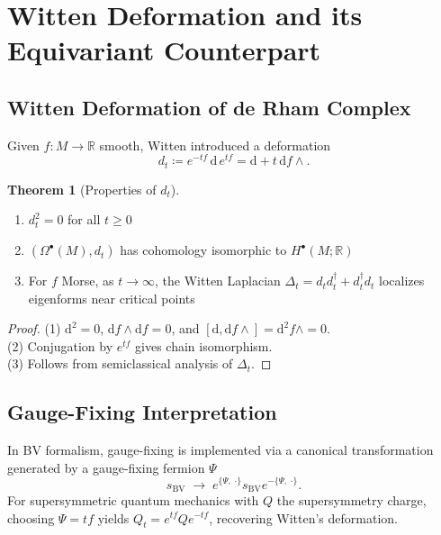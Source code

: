 \documentclass[10pt]{article}
\theoremstyle{definition}
\newtheorem{theorem}[definition]{Theorem}
\newcommand{\diff}{\mathrm{d}}
\newcommand{\R}{\mathbb{R}}
\begin{document}
\section{Witten Deformation and its Equivariant Counterpart}\label{sec:witten}
\subsection{Witten Deformation of de Rham Complex}\label{subsec:witten-def}
Given $f: M \to \R$ smooth, Witten introduced a deformation
\begin{equation}\label{eq:witten-differential}
    d_{t} \coloneqq e^{-tf} \, \diff \, e^{tf} = \diff + t \, \diff f \wedge.
\end{equation}

\begin{theorem}[Properties of $d_t$]
\begin{enumerate}
    \item $d_t^2 = 0$ for all $t \ge 0$
    \item $(\Omega^\bullet(M), d_t)$ has cohomology isomorphic to $H^\bullet(M; \R)$
    \item For $f$ Morse, as $t \to \infty$, the Witten Laplacian $\Delta_t = d_t d_t^\dagger + d_t^\dagger d_t$ localizes eigenforms near critical points
\end{enumerate}
\end{theorem}
\begin{proof}
(1) $\diff^2 = 0$, $\diff f \wedge \diff f = 0$, and $[\diff, \diff f \wedge] = \diff^2 f \wedge = 0$. \\
(2) Conjugation by $e^{tf}$ gives chain isomorphism. \\
(3) Follows from semiclassical analysis of $\Delta_t$.
\end{proof}

\subsection{Gauge-Fixing Interpretation}\label{subsec:gauge-fixing}
In BV formalism, gauge-fixing is implemented via a canonical transformation generated by a gauge-fixing fermion $\Psi$
\begin{equation}\label{eq:gauge-fixing-transformation}
    s_{\text{BV}} \;\longrightarrow\; e^{\{\Psi,\;\cdot\}} s_{\text{BV}} e^{-\{\Psi,\;\cdot\}}.
\end{equation}
For supersymmetric quantum mechanics with $Q$ the supersymmetry charge, choosing $\Psi = t f$ yields $Q_t = e^{tf} Q e^{-tf}$, recovering Witten's deformation.
\end{document}

